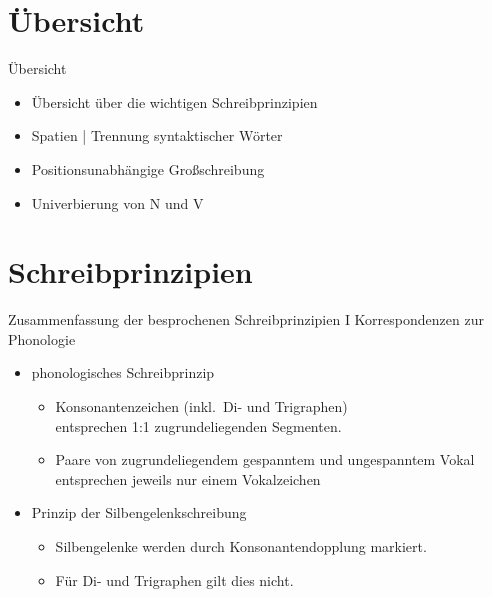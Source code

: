 \section{Übersicht}

\begin{frame}
  {Übersicht}
  \onslide<+->
  \begin{itemize}[<+->]
    \item Übersicht über die wichtigen \alert{Schreibprinzipien}
      \Zeile
    \item \alert{Spatien} | Trennung syntaktischer Wörter
      \Zeile
    \item \alert{Positionsunabhängige Großschreibung}
      \Zeile
    \item Univerbierung von N und V
  \end{itemize}
\end{frame}



\section[Prinzipien]{Schreibprinzipien}

\begin{frame}
  {Zusammenfassung der besprochenen Schreibprinzipien I}
  \pause
  Korrespondenzen zur Phonologie\\
  \Zeile
  \pause
  \begin{itemize}[<+->]
    \item \alert{phonologisches Schreibprinzip}
      \begin{itemize}[<+->]
        \item Konsonantenzeichen (inkl.\ Di- und Trigraphen)\\
          entsprechen 1:1 zugrundeliegenden Segmenten.
        \item Paare von zugrundeliegendem gespanntem und ungespanntem Vokal\\
          entsprechen jeweils nur einem Vokalzeichen 
      \end{itemize}
     \Zeile 
    \item \alert{Prinzip der Silbengelenkschreibung}
      \begin{itemize}[<+->]
        \item Silbengelenke werden durch Konsonantendopplung markiert.
        \item Für Di- und Trigraphen gilt dies nicht.
      \end{itemize}
  \end{itemize}
\end{frame}

